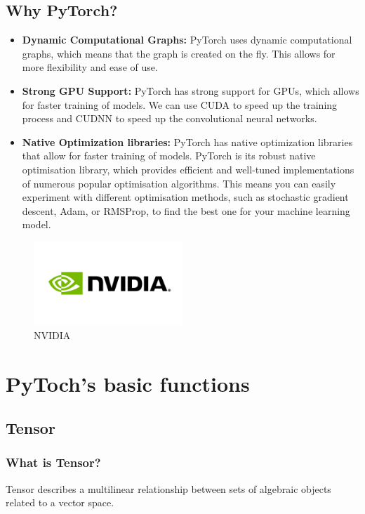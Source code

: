\documentclass[12pt,hyperref,a4paper,UTF8]{article}
\begin{document}
\subsection{Why PyTorch?}
\begin{itemize}
    \item \textbf{Dynamic Computational Graphs:} PyTorch uses dynamic computational graphs, which means that the graph is created on the fly. This allows for more flexibility and ease of use.
    \item \textbf{Strong GPU Support:} PyTorch has strong support for GPUs, which allows for faster training of models. We can use CUDA to speed up the training process and CUDNN to speed up the convolutional neural networks.
    \item \textbf{Native Optimization libraries:} PyTorch has native optimization libraries that allow for faster training of models. PyTorch is its robust native optimisation library, which provides efficient and well-tuned implementations of numerous popular optimisation algorithms. This means you can easily experiment with different optimisation methods, such as stochastic gradient descent, Adam, or RMSProp, to find the best one for your machine learning model.
\end{itemize}
\begin{figure}[h]
    \centering
    \includegraphics[width=0.5\textwidth]{figures/nvidia-logo.png}
    \caption{NVIDIA}
\end{figure}


\section{PyToch's basic functions}

\subsection{Tensor}

\subsubsection{What is Tensor?}
\textbf{} Tensor describes a multilinear relationship between sets of algebraic objects related to a vector space.
\end{document}
